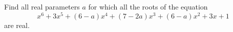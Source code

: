 Find all real parameters $a$ for which all the roots of the equation
$$x^6+3x^5+(6-a)x^4+(7-2a)x^3+(6-a)x^2+3x+1$$are real.